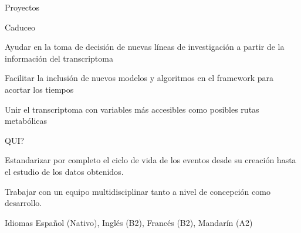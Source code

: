 \documentclass{resume}
\begin{document}
\begin{rSection}{Proyectos}


\begin{rSubsection}{Caduceo}{}{}{}
\item Ayudar en la toma de decisión de nuevas líneas de investigación a partir de la información del transcriptoma
\item Facilitar la inclusión de nuevos modelos y algoritmos en el framework para acortar los tiempos
\item Unir el transcriptoma con variables más accesibles como posibles rutas metabólicas
\end{rSubsection}

\begin{rSubsection}{QUI?}{}{}{}
\item Estandarizar por completo el ciclo de vida de los eventos desde su creación hasta el estudio de los datos obtenidos.
\item Trabajar con un equipo multidisciplinar tanto a nivel de concepción como desarrollo.
\end{rSubsection}


\end{rSection}



\begin{rSection}{Idiomas}{}
  Español (Nativo),
  Inglés (B2), 
  Francés (B2),
  Mandarín (A2)
\end{rSection}
\end{document}
